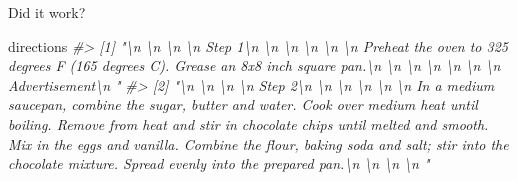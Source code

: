 \documentclass[
  12pt,
]{book}
\newenvironment{Shaded}{\begin{snugshade}}{\end{snugshade}}
\newcommand{\CommentTok}[1]{\textcolor[rgb]{0.37,0.37,0.37}{\textit{#1}}}
\newcommand{\NormalTok}[1]{#1}
\begin{document}
Did it work?

\begin{Shaded}
\begin{Highlighting}[]
\NormalTok{directions}
\CommentTok{\#\textgreater{} [1] "\textbackslash{}n                                    \textbackslash{}n                                      \textbackslash{}n                                        \textbackslash{}n                                          Step 1\textbackslash{}n                                        \textbackslash{}n                                      \textbackslash{}n                                    \textbackslash{}n                                      \textbackslash{}n                                        \textbackslash{}n                                          Preheat the oven to 325 degrees F (165 degrees C). Grease an 8x8 inch square pan.\textbackslash{}n                                        \textbackslash{}n                                        \textbackslash{}n                                      \textbackslash{}n                                        \textbackslash{}n                                          \textbackslash{}n                                        \textbackslash{}n                                      Advertisement\textbackslash{}n                                  "                                           }
\CommentTok{\#\textgreater{} [2] "\textbackslash{}n                                    \textbackslash{}n                                      \textbackslash{}n                                        \textbackslash{}n                                          Step 2\textbackslash{}n                                        \textbackslash{}n                                      \textbackslash{}n                                    \textbackslash{}n                                      \textbackslash{}n                                        \textbackslash{}n                                          In a medium saucepan, combine the sugar, butter and water. Cook over medium heat until boiling. Remove from heat and stir in chocolate chips until melted and smooth. Mix in the eggs and vanilla. Combine the flour, baking soda and salt; stir into the chocolate mixture. Spread evenly into the prepared pan.\textbackslash{}n                                        \textbackslash{}n                                        \textbackslash{}n                                      \textbackslash{}n                                  "}

\end{Highlighting}
\end{Shaded}
\end{document}

